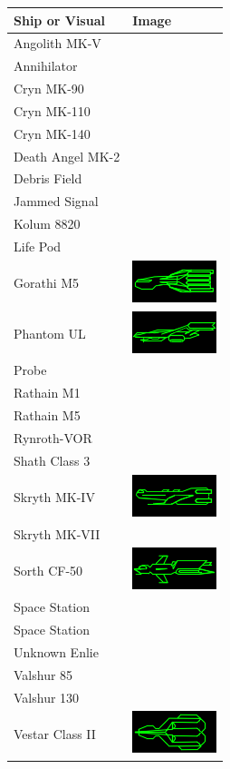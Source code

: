 \begin{tabular}{ | l | l | }
\hline
Ship or Visual & Image \\
\hline
Angolith MK-V & \\
Annihilator & \\
Cryn MK-90 & \\
Cryn MK-110 & \\
Cryn MK-140 & \\
Death Angel MK-2 & \\
Debris Field & \\
Jammed Signal & \\
Kolum 8820 & \\
Life Pod & \\
Gorathi M5 & \includegraphics[scale=0.75]{images/ship_gorathi_m5.png} \\
Phantom UL & \includegraphics[scale=0.75]{images/ship_Phantom_UL.png} \\
Probe & \\
Rathain M1 & \\
Rathain M5 & \\
Rynroth-VOR & \\
Shath Class 3 & \\
Skryth MK-IV & \includegraphics[scale=0.75]{images/ship_skryth_mk-iv.png} \\
Skryth MK-VII & \\
Sorth CF-50 & \includegraphics[scale=0.75]{images/ship_sorth_cf-50.png} \\
Space Station & \\
Space Station & \\
Unknown Enlie & \\
Valshur 85 & \\
Valshur 130 & \\
Vestar Class II & \includegraphics[scale=0.75]{images/ship_vestar_class_2.png} \\

\end{tabular}
